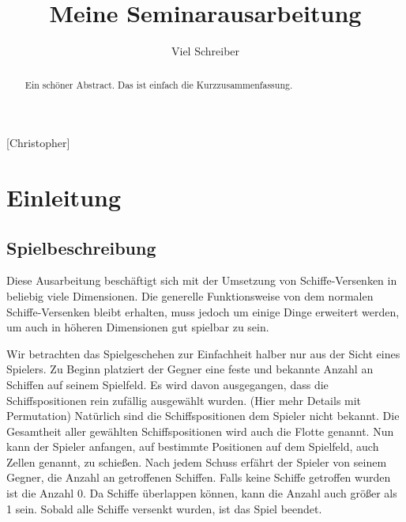 \documentclass[a4paper,12pt]{llncs}
\numberwithin{equation}{section}
\begin{document}

\author{Viel Schreiber}

\title{Meine Seminarausarbeitung}

\maketitle

\thispagestyle{empty}

\begin{abstract}
Ein schöner Abstract. Das ist einfach die Kurzzusammenfassung.
\end{abstract}

[Christopher]

\section{Einleitung}

\subsection{Spielbeschreibung}
Diese Ausarbeitung beschäftigt sich mit der Umsetzung von Schiffe-Versenken in beliebig viele Dimensionen.
Die generelle Funktionsweise von dem normalen Schiffe-Versenken bleibt erhalten, muss jedoch um einige Dinge erweitert werden, um auch in höheren Dimensionen gut spielbar zu sein.

Wir betrachten das Spielgeschehen zur Einfachheit halber nur aus der Sicht eines Spielers.
Zu Beginn platziert der Gegner eine feste und bekannte Anzahl an Schiffen auf seinem Spielfeld. Es wird davon ausgegangen, dass die Schiffspositionen rein zufällig ausgewählt wurden. (Hier mehr Details mit Permutation)
Natürlich sind die Schiffspositionen dem Spieler nicht bekannt.
Die Gesamtheit aller gewählten Schiffspositionen wird auch die Flotte genannt.
Nun kann der Spieler anfangen, auf bestimmte Positionen auf dem Spielfeld, auch Zellen genannt, zu schießen.
Nach jedem Schuss erfährt der Spieler von seinem Gegner, die Anzahl an getroffenen Schiffen.
Falls keine Schiffe getroffen wurden ist die Anzahl 0.
Da Schiffe überlappen können, kann die Anzahl auch größer als 1 sein.
Sobald alle Schiffe versenkt wurden, ist das Spiel beendet.
\end{document}
